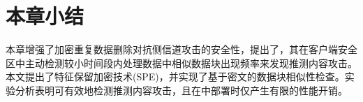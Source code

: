 \section{本章小结}
\label{sec:featurespy-conclusion}
本章增强了加密重复数据删除对抗侧信道攻击的安全性，提出了\sysnameF，其在客户端安全区中主动检测较小时间段内处理数据中相似数据块出现频率来发现推测内容攻击。本文提出了特征保留加密技术(SPE)，并实现了基于密文的数据块相似性检查。实验分析表明\sysnameF 可有效地检测推测内容攻击，且在\sysnameS 中部署时仅产生有限的性能开销。
